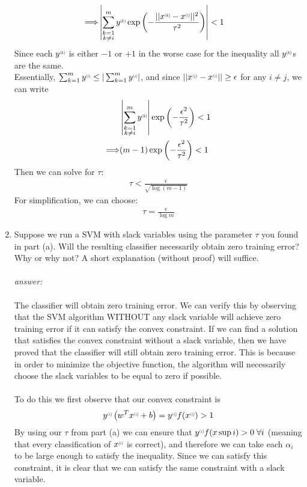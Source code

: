 \documentclass{article}
\newcommand{\supi}[1]{\scalebox{0.6}[0.75]{$^{(#1)}$}}\newcommand{\supi}{\scalebox{0.6}[0.75]{$^{(i)}$}}
\begin{document}
\begin{enumerate}[label=(\alph*)]
\begin{align*}
    \Longrightarrow &\left|  \sum_{\substack{k=1\\k\neq i}}^{m} y\supi{k}\exp\left(-\frac{||x\supi{k}-x\supi{i}||^2}{\tau^2}\right)\right| <1
\end{align*}
Since each $y\supi{k}$ is either $-1$ or $+1$ in the worse case for the inequality all $y\supi{k}$s are the same.\\Essentially, $\sum_{k=1}^{m}y\supi{i}\leq |\sum_{k=1}^{m}y\supi{i} |$, and since $||x\supi{j}-x\supi{i}||\geq \epsilon$ for any $i\neq j$, we can write \begin{align*}
    &\left|  \sum_{\substack{k=1\\k\neq i}}^{m} y\supi{k}\right|\exp\left(-\frac{\epsilon^2}{\tau^2}\right) <1\\
    \Longrightarrow & (m-1)\exp\left(-\frac{\epsilon^2}{\tau^2}\right)<1
\end{align*}
Then we can solve for $\tau$:
\begin{align*}
    \tau <\frac{\epsilon}{\sqrt{\log (m-1)}}
\end{align*}
For simplification, we can choose: \begin{align*}
    \tau = \frac{\epsilon}{\log m}
\end{align*}
\item Suppose we run a SVM with slack variables using the parameter $\tau$ you found in part (a). Will the resulting classifier necessarily obtain zero training error? Why or why not? A short explanation (without proof) will suffice. \\\\
\textit{answer: }\\\\
The classifier will obtain zero training error. We can verify this by observing that the SVM algorithm WITHOUT any slack variable will achieve zero training error if it can satisfy the convex constraint. If we can find a solution that satisfies the convex constraint without a slack variable, then we have proved that the classifier will still obtain zero training error. This is because in order to minimize the objective function, the algorithm will necessarily choose the slack variables to be equal to zero if possible.\\\\To do this we first observe that our convex constraint is
\begin{align*}
    y\supi{i}\left(w^Tx\supi{i} + b\right) = y\supi{i}f(x\supi{i}) > 1
\end{align*}
By using our $\tau$ from part (a) we can ensure that $y\supi{i}f(x\sup{i}) > 0 \;\forall i$ (meaning that every classification of $x\supi{i}$ is correct), and therefore we can take each $\alpha_i$ to be large enough to satisfy the inequality. Since we can satisfy this constraint, it is clear that we can satisfy the same constraint with a slack variable.


\end{enumerate}
\end{document}
